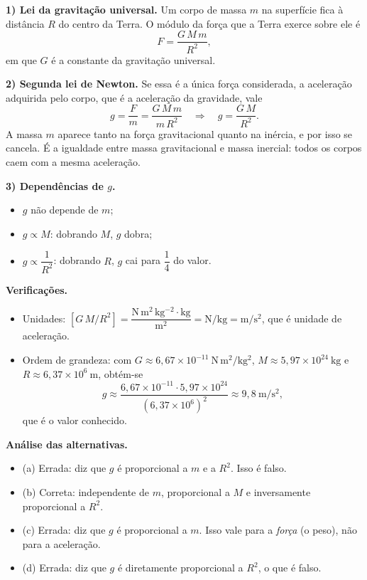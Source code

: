 \documentclass{article}%
\begin{document}
\textbf{1) Lei da gravitação universal.} Um corpo de massa $m$ na superfície fica à distância $R$ do centro da Terra. O módulo da força que a Terra exerce sobre ele é
\[
F = \frac{G\,M\,m}{R^{2}},
\]
em que $G$ é a constante da gravitação universal.

\textbf{2) Segunda lei de Newton.} Se essa é a única força considerada, a aceleração adquirida pelo corpo, que é a aceleração da gravidade, vale
\[
g = \frac{F}{m} = \frac{G\,M\,m}{m\,R^{2}} \quad\Longrightarrow\quad g = \frac{G\,M}{R^{2}}.
\]
A massa $m$ aparece tanto na força gravitacional quanto na inércia, e por isso se cancela. É a igualdade entre massa gravitacional e massa inercial: todos os corpos caem com a mesma aceleração.

\textbf{3) Dependências de $g$.}
\begin{itemize}
\item $g$ não depende de $m$;
\item $g \propto M$: dobrando $M$, $g$ dobra;
\item $g \propto \dfrac{1}{R^{2}}$: dobrando $R$, $g$ cai para $\dfrac{1}{4}$ do valor.
\end{itemize}

\textbf{Verificações.}
\begin{itemize}
\item Unidades: $[G\,M/R^{2}] = \dfrac{\mathrm{N\,m^{2}\,kg^{-2}}\cdot \mathrm{kg}}{\mathrm{m^{2}}} = \mathrm{N/kg} = \mathrm{m/s^{2}}$, que é unidade de aceleração.
\item Ordem de grandeza: com $G \approx 6,67\times 10^{-11}\ \mathrm{N\,m^{2}/kg^{2}}$, $M \approx 5,97\times 10^{24}\ \mathrm{kg}$ e $R \approx 6,37\times 10^{6}\ \mathrm{m}$, obtém-se
\[
g \approx \frac{6,67\times 10^{-11}\cdot 5,97\times 10^{24}}{\left(6,37\times 10^{6}\right)^{2}} \approx 9,8\ \mathrm{m/s^{2}},
\]
que é o valor conhecido.
\end{itemize}

\textbf{Análise das alternativas.}
\begin{itemize}
\item (a) Errada: diz que $g$ é proporcional a $m$ e a $R^{2}$. Isso é falso.
\item (b) Correta: independente de $m$, proporcional a $M$ e inversamente proporcional a $R^{2}$.
\item (c) Errada: diz que $g$ é proporcional a $m$. Isso vale para a \emph{força} (o peso), não para a aceleração.
\item (d) Errada: diz que $g$ é diretamente proporcional a $R^{2}$, o que é falso.
\end{itemize}
\end{document}

